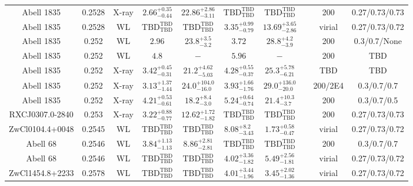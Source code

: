\begin{table}
\begin{tabular}{cccccccccc}
Abell 1835 & 0.2528 & X-ray & ${2.66}^{+0.35}_{-0.44}$ & ${22.86}^{+2.86}_{-3.11}$ & ${\mathrm{TBD}}^{\mathrm{TBD}}_{\mathrm{TBD}}$ & ${\mathrm{TBD}}^{\mathrm{TBD}}_{\mathrm{TBD}}$ & \citet{BA14.1} & 200 & 0.27/0.73/0.73 \\
Abell 1835 & 0.2528 & WL & ${\mathrm{TBD}}^{\mathrm{TBD}}_{\mathrm{TBD}}$ & ${\mathrm{TBD}}^{\mathrm{TBD}}_{\mathrm{TBD}}$ & ${3.35}^{+0.99}_{-0.79}$ & ${13.69}^{+3.65}_{-2.86}$ & \citet{OK10.1} & virial & 0.27/0.73/0.72 \\
Abell 1835 & 0.252 & WL & ${2.96}^{}_{}$ & ${23.8}^{+3.5}_{-3.2}$ & ${3.72}^{}_{}$ & ${28.8}^{+4.2}_{-3.9}$ & \citet{CL02.1} & 200 & 0.3/0.7/None \\
Abell 1835 & 0.252 & WL & ${4.8}^{}_{}$ & ${-}^{}_{}$ & ${5.96}^{}_{}$ & ${-}^{}_{}$ & \citet{CL01.1} & 200 & TBD \\
Abell 1835 & 0.252 & X-ray & ${3.42}^{+0.45}_{-0.31}$ & ${21.2}^{+4.62}_{-5.03}$ & ${4.28}^{+0.55}_{-0.37}$ & ${25.3}^{+5.78}_{-6.21}$ & \citet{SC06.1} & TBD & TBD \\
Abell 1835 & 0.252 & X-ray & ${3.13}^{+1.37}_{-1.44}$ & ${24.0}^{+104.0}_{-16.0}$ & ${3.93}^{+1.66}_{-1.76}$ & ${29.0}^{+136.0}_{-20.0}$ & \citet{VO06.1} & 200/2E4 & 0.3/0.7/0.7 \\
Abell 1835 & 0.252 & X-ray & ${4.21}^{+0.53}_{-0.61}$ & ${18.2}^{+8.4}_{-3.0}$ & ${5.24}^{+0.64}_{-0.74}$ & ${21.4}^{+10.3}_{-3.7}$ & \citet{AL03.1} & 200 & 0.3/0.7/0.5 \\
RXCJ0307.0-2840 & 0.253 & X-ray & ${3.22}^{+0.88}_{-0.77}$ & ${12.62}^{+1.72}_{-1.82}$ & ${\mathrm{TBD}}^{\mathrm{TBD}}_{\mathrm{TBD}}$ & ${\mathrm{TBD}}^{\mathrm{TBD}}_{\mathrm{TBD}}$ & \citet{BA14.1} & 200 & 0.27/0.73/0.73 \\
ZwCl0104.4+0048 & 0.2545 & WL & ${\mathrm{TBD}}^{\mathrm{TBD}}_{\mathrm{TBD}}$ & ${\mathrm{TBD}}^{\mathrm{TBD}}_{\mathrm{TBD}}$ & ${8.08}^{+8.2}_{-3.43}$ & ${1.73}^{+0.58}_{-0.47}$ & \citet{OK10.1} & virial & 0.27/0.73/0.72 \\
Abell 68 & 0.2546 & WL & ${3.84}^{+1.13}_{-1.13}$ & ${8.86}^{+2.81}_{-2.81}$ & ${\mathrm{TBD}}^{\mathrm{TBD}}_{\mathrm{TBD}}$ & ${\mathrm{TBD}}^{\mathrm{TBD}}_{\mathrm{TBD}}$ & \citet{BA07.1} & 200 & 0.3/0.7/0.7 \\
Abell 68 & 0.2546 & WL & ${\mathrm{TBD}}^{\mathrm{TBD}}_{\mathrm{TBD}}$ & ${\mathrm{TBD}}^{\mathrm{TBD}}_{\mathrm{TBD}}$ & ${4.02}^{+3.36}_{-1.82}$ & ${5.49}^{+2.56}_{-1.81}$ & \citet{OK10.1} & virial & 0.27/0.73/0.72 \\
ZwCl1454.8+2233 & 0.2578 & WL & ${\mathrm{TBD}}^{\mathrm{TBD}}_{\mathrm{TBD}}$ & ${\mathrm{TBD}}^{\mathrm{TBD}}_{\mathrm{TBD}}$ & ${4.01}^{+3.44}_{-1.96}$ & ${3.45}^{+2.02}_{-1.36}$ & \citet{OK10.1} & virial & 0.27/0.73/0.72 \\

\end{tabular}
\end{table}
